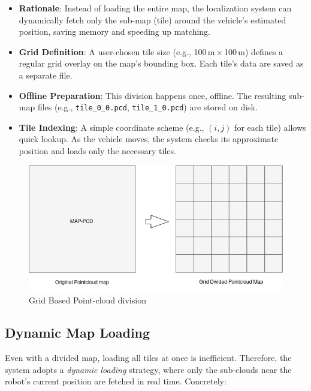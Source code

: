 \begin{itemize}
    \item \textbf{Rationale}: Instead of loading the entire map, the localization system can dynamically fetch only the sub-map (tile) around the vehicle's estimated position, saving memory and speeding up matching.
    \item \textbf{Grid Definition}: A user-chosen tile size (e.g., 100\,m\,$\times$\,100\,m) defines a regular grid overlay on the map's bounding box. Each tile's data are saved as a separate file.
    \item \textbf{Offline Preparation}: This division happens once, offline. The resulting sub-map files (e.g., \texttt{tile\_0\_0.pcd}, \texttt{tile\_1\_0.pcd}) are stored on disk.
    \item \textbf{Tile Indexing}: A simple coordinate scheme (e.g., $(i, j)$ for each tile) allows quick lookup. As the vehicle moves, the system checks its approximate position and loads only the necessary tiles.
\end{itemize}

\begin{figure}
    \centering
    \includegraphics[width=0.8
    \linewidth]{images/map.drawio.png}
    \caption{Grid Based Point-cloud division }
    \label{fig:pointcloud division}
\end{figure}
\subsection{Dynamic Map Loading}

Even with a divided map, loading all tiles at once is inefficient. Therefore, the system adopts a \emph{dynamic loading} strategy, where only the sub-clouds near the robot's current position are fetched in real time. Concretely:

